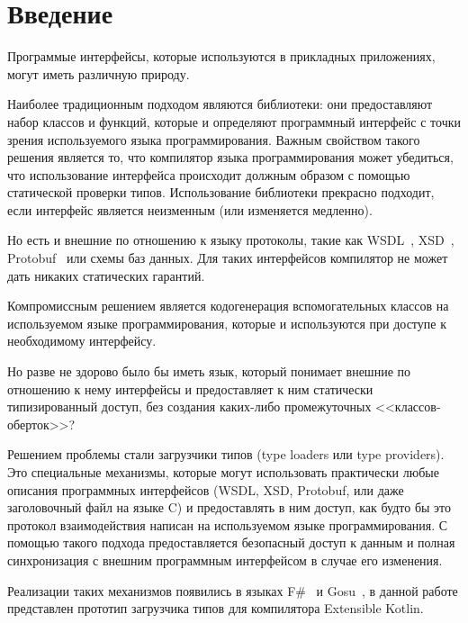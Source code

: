 \clearpage
\section{Введение}

Программые интерфейсы, которые используются в прикладных приложениях, могут иметь различную природу.

Наиболее традиционным подходом являются библиотеки: они предоставляют набор классов и функций, которые и определяют программный интерфейс с точки зрения используемого языка программирования.
Важным свойством такого решения является то, что компилятор языка программирования может убедиться, что использование интерфейса происходит должным образом с помощью статической проверки типов. Использование библиотеки прекрасно подходит, если интерфейс является неизменным (или изменяется медленно).

Но есть и внешние по отношению к языку протоколы, такие как WSDL~\cite{wsdl}, XSD~\cite{xsd1, xsd2}, Protobuf~\cite{protobuf} или схемы баз данных. Для таких интерфейсов компилятор не может дать никаких статических гарантий.

Компромиссным решением является кодогенерация вспомогательных классов на используемом языке программирования, которые и используются при доступе к необходимому интерфейсу.

Но разве не здорово было бы иметь язык, который понимает внешние по отношению к нему интерфейсы и предоставляет к ним статически типизированный доступ, без создания каких-либо промежуточных <<классов-оберток>>?

Решением проблемы стали загрузчики типов (type loaders или type providers). Это специальные механизмы, которые могут использовать практически любые описания программных интерфейсов
(WSDL, XSD, Protobuf, или даже заголовочный файл на языке C) и предоставлять в ним доступ, как будто бы это протокол взаимодействия написан на используемом языке программирования.
С помощью такого подхода предоставляется безопасный доступ к данным и полная синхронизация с внешним программным интерфейсом в случае его изменения.

Реализации таких механизмов появились в языках F\#~\cite{fsharp2010expert} и Gosu~\cite{gosuguide}, в данной работе представлен прототип загрузчика типов для компилятора Extensible Kotlin.

\clearpage